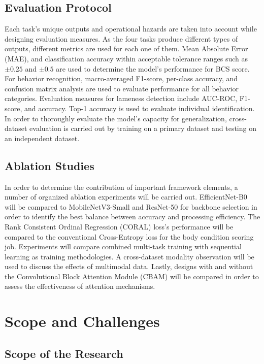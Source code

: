 \subsection{Evaluation Protocol}

Each task's unique outputs and operational hazards are taken into account while designing evaluation measures. As the four tasks produce different types of outputs, different metrics are used for each one of them. Mean Absolute Error (MAE), and classification accuracy within acceptable tolerance ranges such as $\pm0.25$ and $\pm0.5$ are used to determine the model's performance for BCS score. For behavior recognition, macro-averaged F1-score, per-class accuracy, and confusion matrix analysis are used to evaluate performance for all behavior categories. Evaluation measures for lameness detection include AUC-ROC, F1-score, and accuracy. Top-1 accuracy is used to evaluate individual identification. In order to thoroughly evaluate the model's capacity for generalization, cross-dataset evaluation is carried out by training on a primary dataset and testing on an independent dataset.


\subsection{Ablation Studies}

In order to determine the contribution of important framework elements, a number of organized ablation experiments will be carried out. EfficientNet-B0 will be compared to MobileNetV3-Small and ResNet-50 for backbone selection in order to identify the best balance between accuracy and processing efficiency. The Rank Consistent Ordinal Regression (CORAL) loss's performance will be compared to the conventional Cross-Entropy loss for the body condition scoring job. Experiments will compare combined multi-task training with sequential learning as training methodologies. A cross-dataset modality observation will be used to discuss the effects of multimodal data. Lastly, designs with and without the Convolutional Block Attention Module (CBAM) will be compared in order to assess the effectiveness of attention mechanisms.


\section{Scope and Challenges}

\subsection{Scope of the Research}

